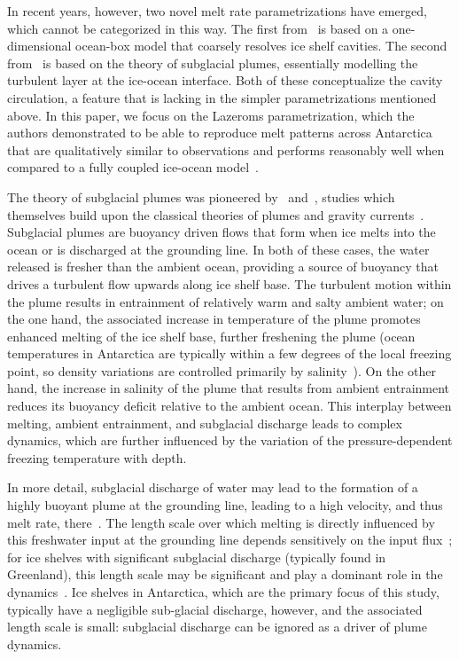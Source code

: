 \documentclass{jfm}
\begin{document}
In recent years, however, two novel melt rate parametrizations have emerged, which cannot be categorized in this way. The first from~\cite{Reese2018Cryo} is based on a one-dimensional ocean-box model that coarsely resolves ice shelf cavities. The second from~\cite{Lazeroms2018TheCryo} is based on the theory of subglacial plumes, essentially modelling the turbulent layer at the ice-ocean interface. Both of these conceptualize the cavity circulation, a feature that is lacking in the simpler parametrizations mentioned above. In this paper, we focus on the Lazeroms parametrization, which the authors demonstrated to be able to reproduce melt patterns across Antarctica that are qualitatively similar to observations and performs reasonably well when compared to a fully coupled ice-ocean model~\citep{Favier2019GeosciModDev}.

The theory of subglacial plumes was pioneered by~\citet{MacAyeal1985} and~\cite{Jenkins1991JGeophysResOceans}, studies which themselves build upon the classical theories of plumes and gravity currents~\citep{Ellison1959JFM, Morton1956PRSL, Turner1979}. Subglacial plumes are buoyancy driven flows that form when ice melts into the ocean or is discharged at the grounding line. In both of these cases, the water released is fresher than the ambient ocean, providing a source of buoyancy that drives a turbulent flow upwards along ice shelf base. The turbulent motion within the plume results in entrainment of relatively warm and salty ambient water; on the one hand, the associated increase in temperature of the plume promotes enhanced melting of the ice shelf base, further freshening the plume (ocean temperatures in Antarctica are typically within a few degrees of the local freezing point, so density variations are controlled primarily by salinity~\citep{Hewitt2020AnnRevFlu}). On the other hand, the increase in salinity of the plume that results from ambient entrainment reduces its buoyancy deficit relative to the ambient ocean. This interplay between melting, ambient entrainment, and subglacial discharge leads to complex dynamics, which are further influenced by the variation of the pressure-dependent freezing temperature with depth. 

In more detail, subglacial discharge of water may lead to the formation of a highly buoyant plume at the grounding line, leading to a high velocity, and thus melt rate, there~\citep{Hewitt2020AnnRevFlu}. The length scale over which melting is directly influenced by this freshwater input at the grounding line depends sensitively on the input flux~\citep{Jenkins2011JPhysOcean}; for ice shelves with significant subglacial discharge (typically found in Greenland), this length scale may be significant and play a dominant role in the dynamics~\citep{Jenkins2011JPhysOcean}. Ice shelves in Antarctica, which are the primary focus of this study, typically have a negligible sub-glacial discharge, however, and the associated length scale is small: subglacial discharge can be ignored as a driver of plume dynamics. 
\end{document}
